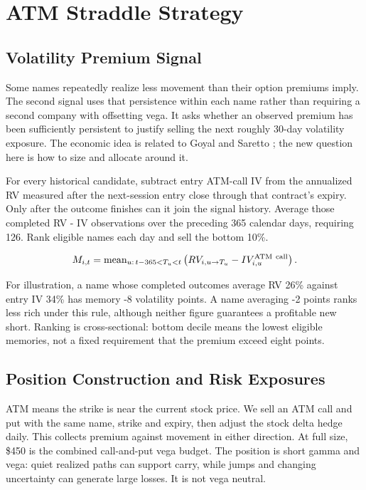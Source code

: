 \section{ATM Straddle Strategy}\label{sec:5}

\subsection*{Volatility Premium Signal}

Some names repeatedly realize less movement than their option premiums imply. The second signal uses that persistence within each name rather than requiring a second company with offsetting vega. It asks whether an observed premium has been sufficiently persistent to justify selling the next roughly 30-day volatility exposure. The economic idea is related to Goyal and Saretto \cite{goyal2009}; the new question here is how to size and allocate around it.


For every historical candidate, subtract entry ATM-call IV from the annualized RV measured after the next-session entry close through that contract's expiry. Only after the outcome finishes can it join the signal history. Average those completed RV - IV observations over the preceding 365 calendar days, requiring 126. Rank eligible names each day and sell the bottom 10\%.


\begin{equation*}M_{i,t}=\operatorname{mean}_{u:\,t-365<T_u<t}\left(RV_{i,u\to T_u}-IV^{\rm ATM\ call}_{i,u}\right).\end{equation*}

For illustration, a name whose completed outcomes average RV 26\% against entry IV 34\% has memory -8 volatility points. A name averaging -2 points ranks less rich under this rule, although neither figure guarantees a profitable new short. Ranking is cross-sectional: bottom decile means the lowest eligible memories, not a fixed requirement that the premium exceed eight points.


\subsection*{Position Construction and Risk Exposures}

ATM means the strike is near the current stock price. We sell an ATM call and put with the same name, strike and expiry, then adjust the stock delta hedge daily. This collects premium against movement in either direction. At full size, \$450 is the combined call-and-put vega budget. The position is short gamma and vega: quiet realized paths can support carry, while jumps and changing uncertainty can generate large losses. It is not vega neutral.


